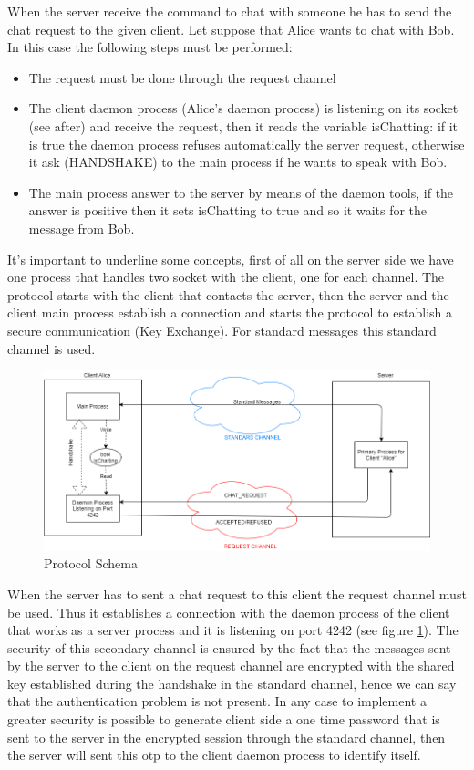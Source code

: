 \documentclass[11pt]{report}
\begin{document}
\noindent When the server receive the command to chat with someone he has to send the chat request to the given client. Let suppose that Alice wants to chat with Bob. In this case the following steps must be performed:

\begin{itemize}
	\item The request must be done through the request channel
	\item The client daemon process (Alice's daemon process) is listening on its socket (see after) and receive the request, then it reads the variable isChatting: if it is true the daemon process refuses automatically the server request, otherwise it ask (HANDSHAKE) to the main process if he wants to speak with Bob. 
	\item The main process answer to the server by means of the daemon tools, if the answer is positive then it sets isChatting to true and so it waits for the message from Bob.
\end{itemize}

\noindent It's important to underline some concepts, first of all on the server side we have one process that handles two socket with the client, one for each channel. The protocol starts with the client that contacts the server, then the server and the client main process establish a connection and starts the protocol to establish a secure communication (Key Exchange). For standard messages this standard channel is used.

\begin{figure}[H]
	\centering
	\includegraphics[scale=0.4]{img/chatRequestProtocolOneProcess.png}
	\caption{Protocol Schema}
	\label {img: chatRequestProtocolOneProcess}
\end{figure}

\noindent When the server has to sent a chat request to this client the request channel must be used. Thus it establishes a connection with the daemon process of the client that works as a server process and it is listening on port 4242 (see figure \ref{img: chatRequestProtocolOneProcess}). The security of this secondary channel is ensured by the fact that the messages sent by the server to the client on the request channel are encrypted with the shared key established during the handshake in the standard channel, hence we can say that the authentication problem is not present. In any case to implement a greater security is possible to generate client side a one time password that is sent to the server in the encrypted session through the standard channel, then the server will sent this otp to the client daemon process to identify itself.
	
\end{document}
